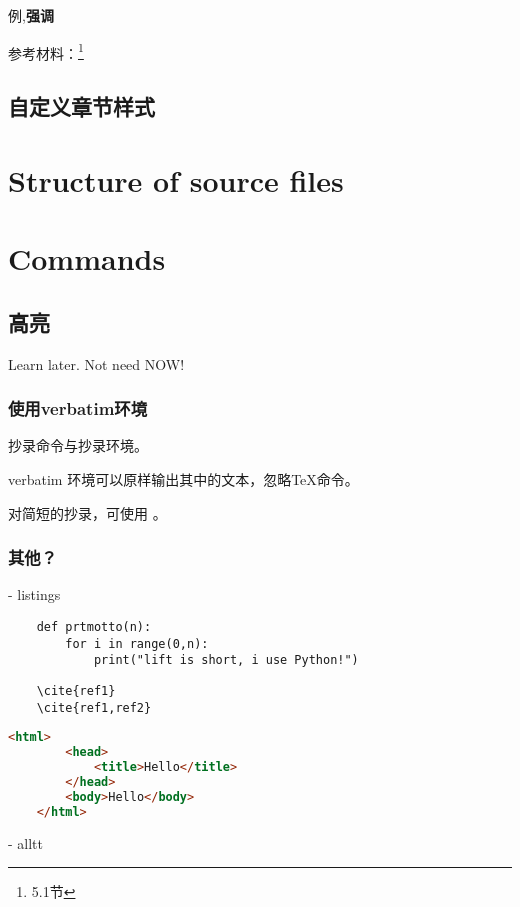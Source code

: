 \documentclass{report}
\newcommand{\qd}[1]{{\bfseries{#1}}}  %
\begin{document}
例,\qd{强调}



参考材料：\footnote{5.1节}

\section{自定义章节样式}


\chapter{Structure of source files}

\chapter{Commands}
\section{高亮}
Learn later. Not need NOW!
\subsection{使用verbatim环境}
抄录命令与抄录环境。

verbatim 环境可以原样输出其中的文本，忽略TeX命令。

对简短的抄录，可使用 。
\subsection{其他？}
- listings


\begin{lstlisting}
	def prtmotto(n):
		for i in range(0,n):
			print("lift is short, i use Python!")
\end{lstlisting}

\begin{lstlisting}
	\cite{ref1}
	\cite{ref1,ref2}
\end{lstlisting}

\begin{lstlisting}[language=html]
	<html>
		<head>
			<title>Hello</title>
		</head>
		<body>Hello</body>
	</html>
\end{lstlisting}

- alltt
\end{document}
